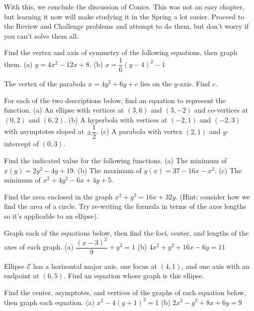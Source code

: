 \documentclass[../book.tex]{subfiles}
\begin{document}
With this, we conclude the discussion of Conics.  This was not an easy chapter, but learning it now will make studying it in the Spring a lot easier.  Proceed to the Review and Challenge problems and attempt to do them, but don't worry if you can't solve them all.  
\begin{reviewset}
\item Find the vertex and axis of symmetry of the following equations, then graph them. \newline 
(a) $y=4x^2-12x+8$.  (b) $x=\dfrac{1}{6}(y-4)^2-1$  \vspace{3mm}
\item The vertex of the parabola $x=4y^2+6y+c$ lies on the $y$-axis.  Find $c$. \vspace{3mm}
\item For each of the two descriptions below, find an equation to represent the function. \newline 
(a) An ellipse with vertices at $(3,6)$ and $(3,-2)$ and co-vertices at $(0,2)$ and $(6,2)$. \newline
(b) A hyperbola with vertices at $(-2,1)$ and $(-2,3)$ with asymptotes sloped at $\pm\dfrac{1}{2}$. \newline
(c) A parabola with vertex $(2,1)$ and $y$-intercept of $(0,3)$. \vspace{3mm}
\item Find the indicated value for the following functions. \newline 
(a) The minimum of $x(y)=2y^2-4y+19$. \newline 
(b) The maximum of $y(x)=37-16x-x^2$. \newline 
(c) The minimum of $x^2+4y^2-6x+4y+5$. \vspace{3mm}
\item Find the area enclosed in the graph $x^2+y^2=16x+32y$. (Hint: consider how we find the area of a circle.  Try re-writing the formula in terms of the axes lengths so it's applicable to an ellipse). \vspace{3mm}
\item Graph each of the equations below, then find the foci, center, and lengths of the axes of each graph. \newline 
(a) $\dfrac{(x-3)^2}{9}+y^2=1$  (b) $4x^2+y^2+16x-6y=11$  \vspace{3mm}
\item Ellipse $\mathcal{E}$ has a horizontal major axis, one focus at $(4,1)$, and one axis with an endpoint at $(6,5)$.  Find an equation whose graph is this ellipse. \vspace{3mm}
\item Find the center, asymptotes, and vertices of the graphs of each equation below, then graph each equation. \newline
(a) $x^2-4(y+1)^2=1$  (b) $2x^2-y^2+8x+6y=9$   \vspace{3mm}
\end{reviewset}
\end{document}
